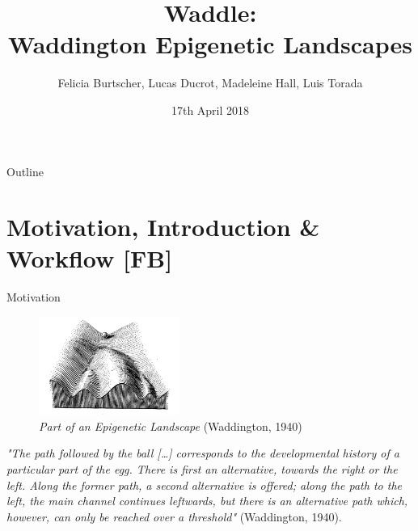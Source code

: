 \documentclass{beamer}
\title[Waddle]{Waddle: \\ Waddington Epigenetic Landscapes}
\author{Felicia Burtscher, Lucas Ducrot, Madeleine Hall, Luis Torada}
\institute{MSc in Bioinformatics and Theoretical Systems Biology \\ Imperial College London}
\date{17th April 2018}
\begin{document}
\begin{frame}
  \titlepage
\end{frame}

\begin{frame}{Outline}
 \tableofcontents
\end{frame}

\section{Motivation, Introduction \& Workflow [FB]}


\begin{frame}{Motivation}

\begin{figure}[b!]
\centering
\includegraphics[width=4.6cm]{ball.PNG}
\caption{\textit{Part of an Epigenetic Landscape} (Waddington, 1940)}\label{ball}
\end{figure}
\textit{"The path followed by the ball […] corresponds to the developmental history of a particular part of the egg.
There is first an alternative, towards the right or the left. Along the former path, a second alternative is offered; along the path to the left, the main channel continues leftwards, but there is an alternative path which, however, can only be reached over a threshold"} (Waddington, 1940).

\end{frame}
\end{document}
